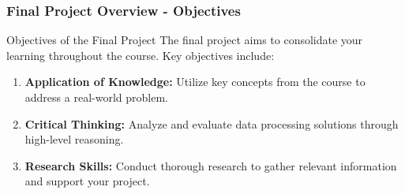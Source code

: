 \documentclass[aspectratio=169]{beamer}
\begin{document}
\begin{frame}[fragile]
    \frametitle{Final Project Overview - Objectives}
    \begin{block}{Objectives of the Final Project}
        The final project aims to consolidate your learning throughout the course. Key objectives include:
        \begin{enumerate}
            \item \textbf{Application of Knowledge:} Utilize key concepts from the course to address a real-world problem.
            \item \textbf{Critical Thinking:} Analyze and evaluate data processing solutions through high-level reasoning.
            \item \textbf{Research Skills:} Conduct thorough research to gather relevant information and support your project.
        \end{enumerate}
    \end{block}
\end{frame}
\end{document}

